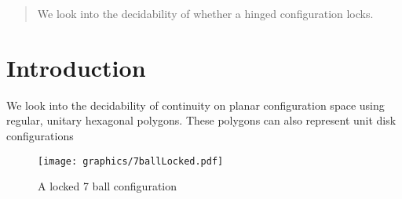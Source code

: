 \begin{abstract}
We look into the decidability of whether a hinged configuration locks.
\end{abstract}
\section{Introduction}
We look into the decidability of continuity on planar configuration space using regular, unitary hexagonal polygons.  These polygons can also represent unit disk configurations \cite{Breu19983} 
\begin{figure}[ht]
\begin{center}
\texttt{[image: graphics/7ballLocked.pdf]}
\caption{A locked 7 ball configuration}
\label{figure:7ballLocked}
\end{center} 
\end{figure}
